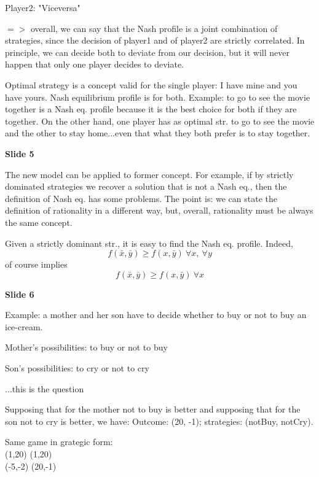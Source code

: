 \noindent Player2: "Viceversa"

\noindent $=>$ overall, we can say that the Nash profile is a joint 
combination of strategies, since the decision of player1 and of 
player2 are strictly correlated. In principle, we can decide both to 
deviate from our decision, but it will never happen that only one 
player decides to deviate.

\noindent Optimal strategy is a concept valid for the single player: I 
have mine and you have yours. Nash equilibrium profile is for both. Example: 
to go to see the movie together is a Nash eq. profile because it is 
the best choice for both if they are together. On the other hand, one 
player has as optimal str. to go to see the movie and the other to 
stay home...even that what they both prefer is to stay together.

\bigskip
\noindent \textbf{Slide 5}

\noindent The new model can be applied to former concept. For example, 
if by strictly dominated strategies we recover a solution that is not 
a Nash eq., then the definition of Nash eq. has some problems. The point 
is: we can state the definition of rationality in a different way, but, 
overall, rationality must be always the same concept.

\noindent Given a strictly dominant str., it is easy to find the Nash 
eq. profile. Indeed,
\[
	f(\bar{x},\bar{y}) \geq f(x,\bar{y}) ~\forall x,~\forall y
\]
of course implies
\[
	f(\bar{x},\bar{y}) \geq f(x,\bar{y}) ~\forall x
\]

\bigskip
\noindent \textbf{Slide 6}

\noindent Example: a mother and her son have to decide whether to 
buy or not to buy an ice-cream.

\noindent Mother's possibilities: to buy or not to buy

\noindent Son's possibilities: to cry or not to cry

\noindent ...this is the question

\noindent Supposing that for the mother not to buy is better and 
supposing that for the son not to cry is better, we have: 
Outcome: (20, -1); strategies: (notBuy, notCry).

\noindent Same game in grategic form:\\
(1,20)	(1,20)\\
(-5,-2)	(20,-1)\\

